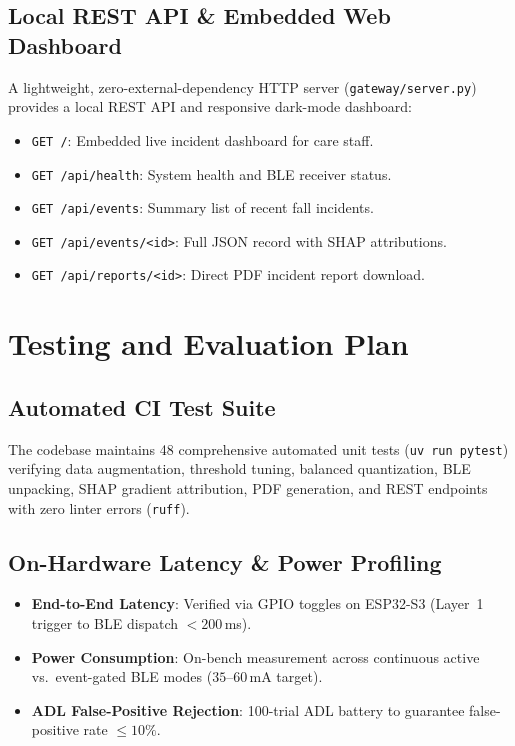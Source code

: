 \subsection{Local REST API \& Embedded Web Dashboard}

A lightweight, zero-external-dependency HTTP server (\texttt{gateway/server.py}) provides a local REST API and responsive dark-mode dashboard:
\begin{itemize}
    \item \texttt{GET /}: Embedded live incident dashboard for care staff.
    \item \texttt{GET /api/health}: System health and BLE receiver status.
    \item \texttt{GET /api/events}: Summary list of recent fall incidents.
    \item \texttt{GET /api/events/<id>}: Full JSON record with SHAP attributions.
    \item \texttt{GET /api/reports/<id>}: Direct PDF incident report download.
\end{itemize}

\section{Testing and Evaluation Plan}

\subsection{Automated CI Test Suite}

The codebase maintains 48 comprehensive automated unit tests (\texttt{uv run pytest}) verifying data augmentation, threshold tuning, balanced quantization, BLE unpacking, SHAP gradient attribution, PDF generation, and REST endpoints with zero linter errors (\texttt{ruff}).

\subsection{On-Hardware Latency \& Power Profiling}

\begin{itemize}
    \item \textbf{End-to-End Latency}: Verified via GPIO toggles on ESP32-S3 (Layer~1 trigger to BLE dispatch \(<200\)\,ms).
    \item \textbf{Power Consumption}: On-bench measurement across continuous active vs.\ event-gated BLE modes (\(35\text{--}60\)\,mA target).
    \item \textbf{ADL False-Positive Rejection}: 100-trial ADL battery to guarantee false-positive rate \(\le 10\%\).
\end{itemize}
